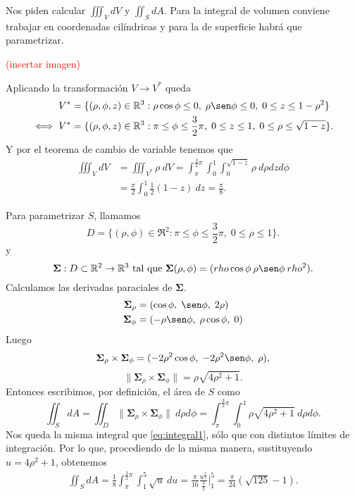 \begin{solution}
    Nos piden calcular $\iiint_V dV$ y $\iint_S dA$. Para la
    integral de volumen conviene trabajar en coordenadas
    cil\'indricas y para la de superficie habr\'a que parametrizar.

    \textcolor{red}{(insertar imagen)}

    Aplicando la transformaci\'on $V \rightarrow V^*$ queda
    \begin{align*}
        V^*      & =\{(\rho, \phi, z)\in\Re^3: \rho\cos\phi \leq 0,\;
        \rho\sen\phi \leq 0,\; 0 \leq z \leq 1-\rho^2\}               \\
        \iff V^* & =\{(\rho, \phi, z)\in\Re^3: \pi \leq \phi \leq
        \frac{3}{2}\pi,\; 0 \leq z \leq 1,\; 0 \leq \rho \leq
        \sqrt{1-z} \}.
    \end{align*}
    Y por el teorema de cambio de variable tenemos que
    \begin{align*}
        \iiint_V dV & = \iiint_{V^*} \rho\:dV = \int_\pi^{\frac{3}{2}\pi}
        \int_0^1\int_0^{\sqrt{1-z}}\rho\:d\rho dz d\phi                   \\
                    & =\frac{\pi}{2}\int_0^1\frac{1}{2}(1-z)\:dz =
        \frac{\pi}{8}.
    \end{align*}

    Para parametrizar $S$, llamamos
    \[
        D = \{(\rho, \phi)\in\Re^2 : \pi\leq\phi\leq\frac{3}{2}\pi,\;
        0\leq\rho\leq 1\}.
    \]
    y
    \[
        \boldsymbol{\Sigma}:D\subset\Re^2\rightarrow\Re^3\text{ tal que }
        \boldsymbol{\Sigma}(\rho,\phi)=(rho\cos\phi\:\rho\sen\phi\:rho^2).
    \]
    Calculamos las derivadas paraciales de $\boldsymbol{\Sigma}$.
    \begin{align*}
        \boldsymbol{\Sigma}_{\rho}&=(\cos \phi,\;\sen \phi,\; 2\rho)\\
        \boldsymbol{\Sigma}_\phi&=(  -\rho \sen \phi,\;\rho \cos \phi,\;0)
        \end{align*}
    Luego
    $$
        \boldsymbol{\Sigma}_{\rho} \times\boldsymbol{\Sigma}_\phi =
        (-2\rho^2 \cos\phi  , \;-2\rho^2 \sen \phi, \;\rho),
    $$ 
    $$\|\boldsymbol{\Sigma}_{\rho} \times\boldsymbol{\Sigma}_\phi\|
        = \rho\sqrt{4\rho^2+1}.
    $$ 
    Entonces escribimos, por definici\'on, el \'area de $S$ como
    \[
        \iint_S dA = \iint_D \| \boldsymbol{\Sigma}_{\rho}
        \times\boldsymbol{\Sigma}_\phi\|\:d\rho d\phi = \int_\pi^{\frac{3}{2}\pi}\int_0^1\rho\sqrt{4\rho^2+1}\:d\rho d\phi.
    \]
    Nos queda la misma integral que \eqref{eq:integral1}, s\'olo que con distintos l\'imites de integraci\'on. Por lo que, procediendo de la misma manera, sustituyendo $u = 4\rho^2+1$, obtenemos
    \begin{gather*}
        \iint_S dA =
        \frac{1}{8}\int_\pi^{\frac{3}{2}\pi}\int_1^5\sqrt{u}\:du =
        \frac{\pi}{16}\frac{u^{\frac{3}{2}}}{\frac{3}{2}}\Bigg\lvert_1^5 =
        \frac{\pi}{24}(\sqrt{125}-1).
    \end{gather*}
\end{solution}

